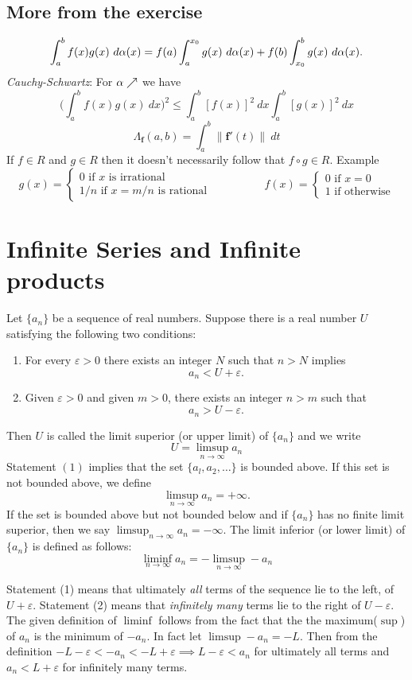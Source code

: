 \documentclass[10pt,a4paper]{book}
\begin{document}
\section*{More from the exercise}
$$\int_a^b f(x)g(x) \ \da(x) = f(a)\int_a^{x_0} g(x) \ \da(x) + f(b)\int_{x_0}^b g(x) \ \da(x).$$
\noindent \textit{Cauchy-Schwartz}: For $\alpha \nearrow$ we have
$$\bigg(\int_{a}^b f(x)g(x)\ dx \bigg)^2 \leq \int_{a}^b [f(x)]^2\ dx \int_{a}^b [g(x)]^2\ dx $$
$$\Lambda_\mathbf{f}(a,b) =  \int_{a}^b \lVert \mathbf{f}'(t) \rVert\  dt$$
\noindent If $f\in R$ and $g \in R$ then it doesn't necessarily follow that $f \circ g \in R$. Example 
$$g(x) = \begin{cases}
0 \text{ if $x$ is irrational}\\
1/n \text{ if $x = m/n$ is  rational}
\end{cases} \hspace{2cm}
f(x) = \begin{cases}
0 \text{ if $x = 0$}\\
1 \text{ if otherwise}
\end{cases}
$$
\chapter{Infinite Series and Infinite products}

\begin{deff}
Let $\{a_n\}$ be a sequence of real numbers. Suppose there is a real number $U$ satisfying the following two conditions:
\begin{enumerate}
    \item For every $\varepsilon > 0$ there exists an integer $N$ such that $n > N$ implies
    $$a_n < U + \varepsilon.$$
    \item Given $\varepsilon > 0$ and given $m > 0$, there exists an integer $n > m$ such that
    $$a_n > U - \varepsilon.$$
   
    
    
\end{enumerate}
 Then $U$ is called the limit superior (or upper limit) of $\{a_n\}$ and we write
    $$U =\limsup_{n \rightarrow \infty} a_n $$
Statement $(1)$ implies that the set $\{a_l, a_2, \dots \}$ is bounded above. If this set is not bounded above, we define 
$$\limsup_{n \rightarrow \infty} a_n = + \infty.$$
If the set is bounded above but not bounded below and if $\{a_n\}$ has no finite limit superior, then we say $\limsup_{n \rightarrow \infty} a_n = -\infty$. The limit inferior (or lower limit) of $\{a_n\}$ is defined as follows:
$$\liminf_{n \rightarrow \infty} a_n = - \limsup_{n \rightarrow \infty} -a_n$$
\end{deff}
\PP Statement (1) means that ultimately \textit{all} terms of the sequence lie to the left, of $U + \varepsilon$. Statement (2) means that\textit{ infinitely many} terms lie to the right of $U -\varepsilon.$ The given definition of $\liminf$ follows from the fact that the the maximum($\sup$) of $a_n$ is the minimum of $-a_n$. In fact let $\limsup -a_n = -L.$ Then from the definition $-L-\varepsilon < -a_n < -L + \varepsilon \implies L - \varepsilon < a_n$ for ultimately all terms and $a_n < L + \varepsilon$ for infinitely many terms.
\end{document}
